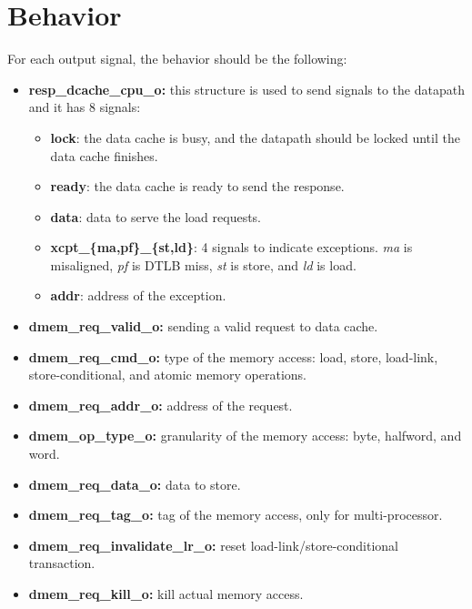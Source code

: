\section{Behavior}
\label{behavior}

For each output signal, the behavior should be the following:

\begin{itemize}
    \item \textbf{resp\_dcache\_cpu\_o:} this structure is used to send signals to the datapath and it has 8 signals:
    \begin{itemize}
        \item \textbf{lock}: the data cache is busy, and the datapath should be locked until the data cache finishes.
        \item \textbf{ready}: the data cache is ready to send the response.
        \item \textbf{data}: data to serve the load requests.
        \item \textbf{xcpt\_\{ma,pf\}\_\{st,ld\}}: 4 signals to indicate exceptions. \textit{ma} is misaligned, \textit{pf} is DTLB miss, \textit{st} is store, and \textit{ld} is load.
        \item \textbf{addr}: address of the exception.
    \end{itemize}
    \item \textbf{dmem\_req\_valid\_o:} sending a valid request to data cache.
    \item \textbf{dmem\_req\_cmd\_o:} type of the memory access: load, store, load-link, store-conditional, and atomic memory operations.
    \item \textbf{dmem\_req\_addr\_o:} address of the request.
    \item \textbf{dmem\_op\_type\_o:} granularity of the memory access: byte, halfword, and word.
    \item \textbf{dmem\_req\_data\_o:} data to store.
    \item \textbf{dmem\_req\_tag\_o:} tag of the memory access, only for multi-processor.
    \item \textbf{dmem\_req\_invalidate\_lr\_o:} reset load-link/store-conditional transaction.
    \item \textbf{dmem\_req\_kill\_o:} kill actual memory access.
\end{itemize}